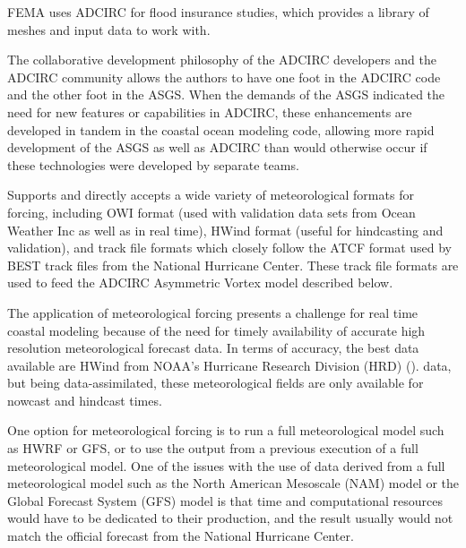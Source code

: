 \documentclass[jmse,article,submit,moreauthors,pdftex,12pt,a4paper]{mdpi}
\begin{document}
FEMA uses ADCIRC for flood insurance studies, which provides a library
of meshes and input data to work with.

The collaborative development philosophy of the ADCIRC developers
and the ADCIRC community allows the authors to have one foot in the
ADCIRC code and the other foot in the ASGS. When the demands of the
ASGS indicated the need for new features or capabilities in ADCIRC, 
these enhancements are developed in tandem in the coastal ocean modeling
code, allowing more rapid development of the ASGS as well as ADCIRC
than would otherwise occur if these technologies were developed by
separate teams. 

Supports and directly accepts a wide variety of meteorological 
formats for forcing, including OWI format (used with validation data 
sets from Ocean Weather Inc as well as in real time), HWind format 
(useful for hindcasting and validation), and track file formats which
closely follow the ATCF format used by BEST track files from the 
National Hurricane Center. These track file formats are used to feed
the ADCIRC Asymmetric Vortex model described below. 

The application of meteorological forcing presents a challenge for 
real time coastal modeling because of the need for timely 
availability of accurate high resolution meteorological forecast 
data. In terms of accuracy, the best data available are HWind from 
NOAA's Hurricane Research Division (HRD) (\cite{PowellMD1998}). 
data, but being data-assimilated, these meteorological fields are 
only available for nowcast and hindcast times.

One option for meteorological forcing is to run a full 
meteorological model such as HWRF or GFS, or to use the output from 
a previous execution of a full meteorological model. One of the 
issues with the use of data derived from a full meteorological model 
such as the North American Mesoscale (NAM) model or the Global 
Forecast System (GFS) model is that time and computational resources 
would have to be dedicated to their production, and the result 
usually would not match the official forecast from the National 
Hurricane Center. 
\end{document}
